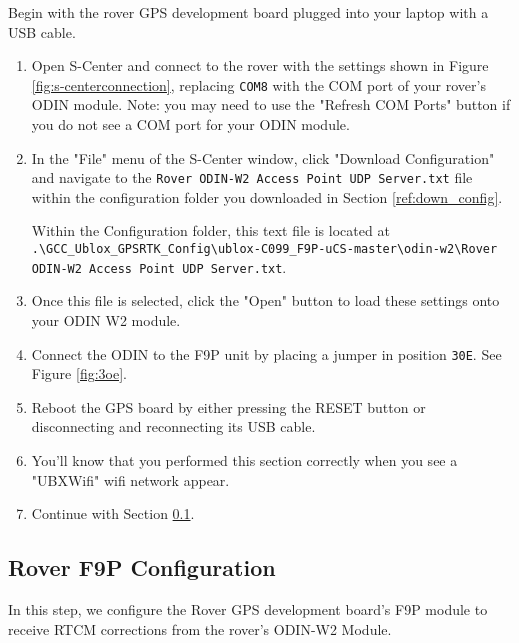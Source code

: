 \documentclass{article}%
\begin{document}
Begin with the rover GPS development board plugged into your laptop with a USB cable.

\begin{enumerate}
\item Open S-Center and connect to the rover with the settings shown in Figure \ref{fig:s-centerconnection}, replacing \texttt{COM8} with the COM port of your rover's ODIN module. Note: you may need to use the "Refresh COM Ports" button if you do not see a COM port for your ODIN module.
\item In the "File" menu of the S-Center window, click "Download Configuration" and navigate to the \texttt{Rover ODIN-W2 Access Point UDP Server.txt} file within the configuration folder you downloaded in Section \ref{ref:down_config}.

	Within the Configuration folder, this text file is located at \\ \texttt{.\textbackslash GCC\_Ublox\_GPSRTK\_Config\textbackslash ublox-C099\_F9P-uCS-master\textbackslash odin-w2\textbackslash Rover ODIN-W2 Access Point UDP Server.txt}.
\item Once this file is selected, click the "Open" button to load these settings onto your ODIN W2 module.
\item Connect the ODIN to the F9P unit by placing a jumper in position \texttt{30E}. See Figure \ref{fig:3oe}.
\item Reboot the GPS board by either pressing the RESET button or disconnecting and reconnecting its USB cable.
\item You'll know that you performed this section correctly when you see a "UBXWifi" wifi network appear.
\item Continue with Section \ref{ref:Rover_f9p_config}.
\end{enumerate}

\subsection{Rover F9P Configuration}\label{ref:Rover_f9p_config}

In this step, we configure the Rover GPS development board's F9P module to receive RTCM corrections from the rover's ODIN-W2 Module.
\end{document}
